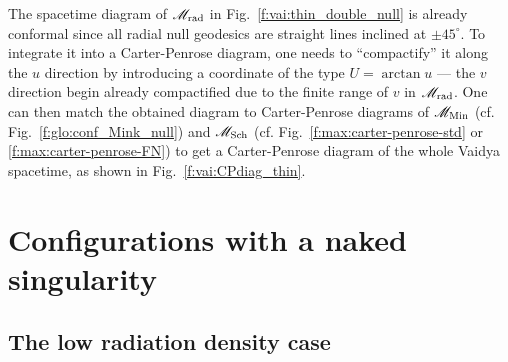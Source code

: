 The spacetime diagram of $\mathscr{M}_{\rm rad}$ in Fig.~\ref{f:vai:thin_double_null}
is already conformal since all radial null geodesics are straight lines
inclined at $\pm 45^\circ$. To integrate it into a Carter-Penrose diagram,
one needs to ``compactify'' it along the $u$ direction by introducing a
coordinate of the type $U = \arctan u$ --- the $v$ direction begin already
compactified due to the finite range of $v$ in $\mathscr{M}_{\rm rad}$.
One can then match the obtained diagram to
Carter-Penrose diagrams of $\mathscr{M}_{\rm Min}$ (cf. Fig.~\ref{f:glo:conf_Mink_null})
and $\mathscr{M}_{\rm Sch}$ (cf. Fig.~\ref{f:max:carter-penrose-std} or \ref{f:max:carter-penrose-FN})
to get a Carter-Penrose diagram of the whole Vaidya spacetime, as shown
in Fig.~\ref{f:vai:CPdiag_thin}.



\section{Configurations with a naked singularity} \label{s:vai:naked_sing}

\subsection{The low radiation density case} \label{s:vai:low_alpha}

